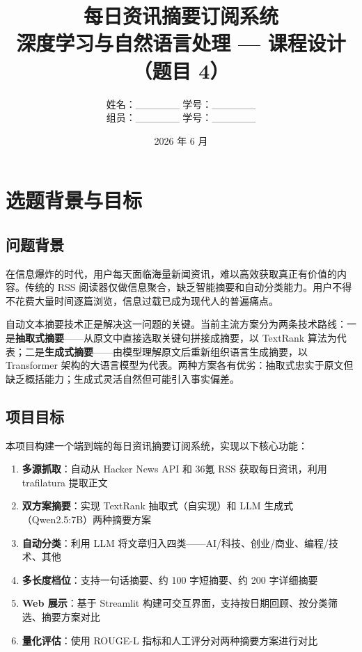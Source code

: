 \documentclass[12pt,a4paper]{ctexart}
\title{\textbf{每日资讯摘要订阅系统}\\[6pt]
       \large 深度学习与自然语言处理 — 课程设计（题目 4）}
\author{姓名：\_\_\_\_\_\_ \quad 学号：\_\_\_\_\_\_ \\[4pt]
        组员：\_\_\_\_\_\_ \quad 学号：\_\_\_\_\_\_}
\date{2026 年 6 月}
\begin{document}
\maketitle
\thispagestyle{empty}

\section{选题背景与目标}

\subsection{问题背景}

在信息爆炸的时代，用户每天面临海量新闻资讯，难以高效获取真正有价值的内容。传统的 RSS 阅读器仅做信息聚合，缺乏智能摘要和自动分类能力。用户不得不花费大量时间逐篇浏览，信息过载已成为现代人的普遍痛点。

自动文本摘要技术正是解决这一问题的关键。当前主流方案分为两条技术路线：一是\textbf{抽取式摘要}——从原文中直接选取关键句拼接成摘要，以 TextRank 算法为代表；二是\textbf{生成式摘要}——由模型理解原文后重新组织语言生成摘要，以 Transformer 架构的大语言模型为代表。两种方案各有优劣：抽取式忠实于原文但缺乏概括能力；生成式灵活自然但可能引入事实偏差。

\subsection{项目目标}

本项目构建一个端到端的每日资讯摘要订阅系统，实现以下核心功能：

\begin{enumerate}[label=(\arabic*),nosep]
    \item \textbf{多源抓取}：自动从 Hacker News API 和 36氪 RSS 获取每日资讯，利用 trafilatura 提取正文
    \item \textbf{双方案摘要}：实现 TextRank 抽取式（自实现）和 LLM 生成式（Qwen2.5:7B）两种摘要方案
    \item \textbf{自动分类}：利用 LLM 将文章归入四类——AI/科技、创业/商业、编程/技术、其他
    \item \textbf{多长度档位}：支持一句话摘要、约 100 字短摘要、约 200 字详细摘要
    \item \textbf{Web 展示}：基于 Streamlit 构建可交互界面，支持按日期回顾、按分类筛选、摘要方案对比
    \item \textbf{量化评估}：使用 ROUGE-L 指标和人工评分对两种摘要方案进行对比
\end{enumerate}
\end{document}
